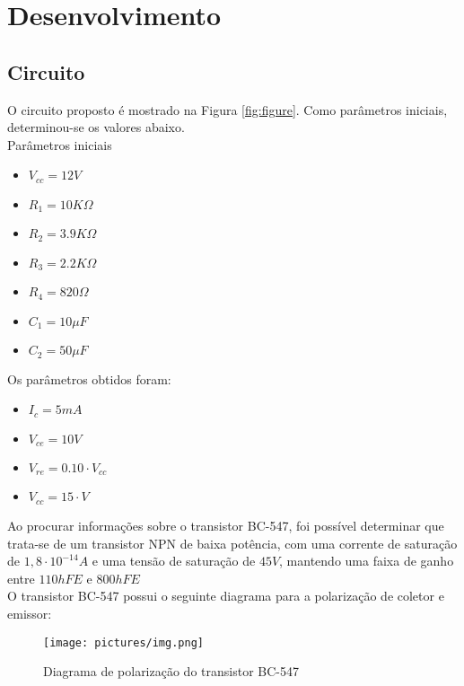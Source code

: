 \section{Desenvolvimento}
\label{sec:desenvolvimento}
    \subsection{Circuito}
    \label{sec:circuito}
        \indent O circuito proposto é mostrado na Figura \ref{fig:figure}.
        Como parâmetros iniciais, determinou-se os valores abaixo.\\

        \indent Parâmetros iniciais
        \begin{itemize}
            \item $V_{cc} = 12V$
            \item $R_1 = 10K\Omega$
            \item $R_2 = 3.9K\Omega$
            \item $R_3 = 2.2K\Omega$
            \item $R_4 = 820\Omega$
            \item $C_1 = 10\mu F$
            \item $C_2 = 50\mu F$
        \end{itemize}
        \onehalfspace

        \indent Os parâmetros obtidos foram:
        \begin{itemize}
            \item $I_c = 5 mA$
            \item $V_{ce} = 10V$
            \item $V_{re} = 0.10\cdot V_{cc}$
            \item $V_{cc} = 15\cdot V$
        \end{itemize}

    \indent Ao procurar informações sobre o transistor BC-547, foi possível determinar que trata-se de um transistor NPN de baixa potência, com uma corrente de saturação de $1,8 \cdot 10^{-14} A$ e uma tensão de saturação de $45 V$, mantendo uma faixa de ganho entre $110 hFE$ e $800 hFE$\\

    \indent O transistor BC-547 possui o seguinte diagrama para a polarização de coletor e emissor:
    \begin{figure}[h!]
        \centering
        \texttt{[image: pictures/img.png]}
        \caption{Diagrama de polarização do transistor BC-547}
        \label{fig:BC547}
    \end{figure}


